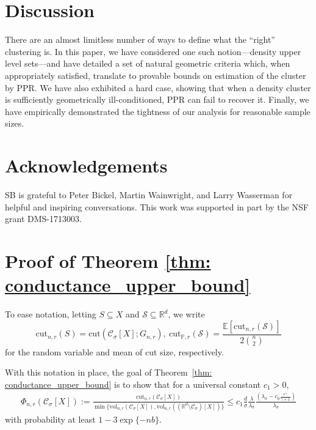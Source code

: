\documentclass[11pt,twoside]{article}
\newcommand{\vol}{\mathrm{vol}}
\newcommand{\cut}{\mathrm{cut}}
\newcommand{\Reals}{\mathbb{R}}
\newcommand{\Rd}{\Reals^d}
\newcommand{\1}{\mathbbm{1}}
\newcommand{\Xbf}{X}
\newcommand{\Pbb}{\mathbb{P}}
\newcommand{\Sset}{\mathcal{S}}
\newcommand{\Cset}{\mathcal{C}}
\newcommand{\Csig}{\Cset_{\sigma}}
\begin{document}
\section{Discussion}
\label{sec: discussion}

There are an almost limitless number of ways to define what the ``right''
clustering is. In this paper, we have considered one such notion---density upper
level sets---and have detailed a set of natural geometric criteria which, when 
appropriately satisfied, translate to provable bounds on estimation of the
cluster by PPR. We have also exhibited a hard case, showing that when a density
cluster is sufficiently geometrically ill-conditioned, PPR can fail to recover
it. Finally, we have empirically demonstrated the tightness of our analysis for
reasonable sample sizes.  

\section*{Acknowledgements}

SB is grateful to Peter Bickel, Martin Wainwright, and Larry Wasserman for
helpful and inspiring conversations. This work was supported in part by the NSF grant DMS-1713003.

\appendix

\section{Proof of Theorem \ref{thm: conductance_upper_bound}}
\label{sec: proof_of_theorem_1}

To ease notation, letting $S \subseteq X$ and $\Sset \subseteq \Reals^d$, we write
\begin{equation*}
\cut_{n,r}(S) = \cut(\Csig[\Xbf]; G_{n,r}), ~ \cut_{\Pbb,r}(\Sset)= \frac{\mathbb{E}[\cut_{n,r}(\Sset)]}{2{n \choose 2}}
\end{equation*}
for the random variable and mean of cut size, respectively.

With this notation in place, the goal of Theorem~\ref{thm: conductance_upper_bound} is to show that for a universal constant $c_1 > 0$,
\begin{align*}
\Phi_{n,r}(\Csig[\Xbf]) := \frac{\cut_{n,r}(\Csig[\Xbf])}{\min\{\vol_{n,r}(\Csig[\Xbf]), \vol_{n,r}((\Rd \setminus \Csig)[\Xbf])\}} \leq c_1 \frac{d}{\sigma}
    \frac{\lambda}{\lambda_{\sigma}} \frac{(\lambda_{\sigma} -
      c_0\frac{r^{\gamma}}{\gamma+1})}{\lambda_{\sigma}}
\end{align*}
with probability at least $1 - 3\exp\{-nb\}$.
\end{document}

